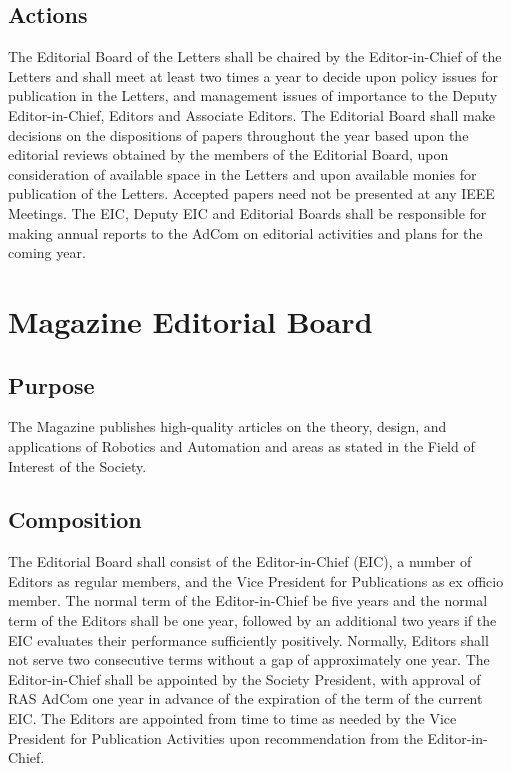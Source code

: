 \documentclass[10pt]{article}
\begin{document}
\subsection{Actions}

The Editorial Board of the Letters shall be chaired by the Editor-in-Chief of the Letters and shall meet at least two times a year to decide upon policy issues for publication in the Letters, and management issues of importance to the Deputy Editor-in-Chief, Editors and Associate Editors.  The Editorial Board shall make decisions on the dispositions of papers throughout the year based upon the editorial reviews obtained by the members of the Editorial Board, upon consideration of available space in the Letters and upon available monies for publication of the Letters.  Accepted papers need not be presented at any IEEE Meetings. The EIC, Deputy EIC and Editorial Boards shall be responsible for making annual reports to the AdCom on editorial activities and plans for the coming year.


\section{Magazine Editorial Board}
\subsection{Purpose}

The Magazine publishes high-quality articles on the theory, design, and applications of Robotics and Automation and areas as stated in the Field of Interest of the Society.


\subsection{Composition}
\label{MEB:Composition}
The Editorial Board shall consist of the Editor-in-Chief (EIC), a number of Editors as regular members, and the Vice President for Publications as ex officio member.  The normal term of the Editor-in-Chief be five years and the normal term of the Editors shall be one year, followed by an additional two years if the EIC evaluates their performance sufficiently positively. Normally, Editors shall not serve two consecutive terms without a gap of approximately one year.  The Editor-in-Chief shall be appointed by the Society President, with approval of RAS AdCom one year in advance of the expiration of the term of the current EIC.  The Editors are appointed from time to time as needed by the Vice President for Publication Activities upon recommendation from the Editor-in-Chief.
\end{document}
